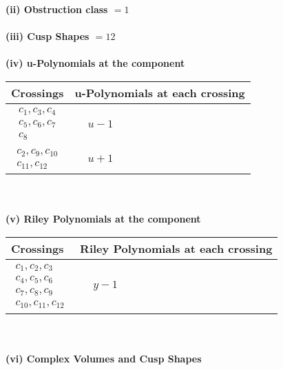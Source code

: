 \documentclass[1p]{elsarticle_modified}
\theoremstyle{definition}
\begin{document}
\flushleft \textbf{(ii) Obstruction class $= 1$}\\~\\
\flushleft \textbf{(iii) Cusp Shapes $= 12$}\\~\\
\newpage\renewcommand{\arraystretch}{1}
\flushleft \textbf{(iv) u-Polynomials at the component}\newline \\
\begin{tabular}{m{50pt}|m{274pt}}
Crossings & \hspace{64pt}u-Polynomials at each crossing \\
\hline $$\begin{aligned}c_{1},c_{3},c_{4}\\c_{5},c_{6},c_{7}\\c_{8}\end{aligned}$$&$\begin{aligned}
&u-1
\end{aligned}$\\
\hline $$\begin{aligned}c_{2},c_{9},c_{10}\\c_{11},c_{12}\end{aligned}$$&$\begin{aligned}
&u+1
\end{aligned}$\\
\hline
\end{tabular}\\~\\
\newpage\renewcommand{\arraystretch}{1}
\flushleft \textbf{(v) Riley Polynomials at the component}\newline \\
\begin{tabular}{m{50pt}|m{274pt}}
Crossings & \hspace{64pt}Riley Polynomials at each crossing \\
\hline $$\begin{aligned}c_{1},c_{2},c_{3}\\c_{4},c_{5},c_{6}\\c_{7},c_{8},c_{9}\\c_{10},c_{11},c_{12}\end{aligned}$$&$\begin{aligned}
&y-1
\end{aligned}$\\
\hline
\end{tabular}\\~\\
\newpage\flushleft \textbf{(vi) Complex Volumes and Cusp Shapes}
\end{document}
